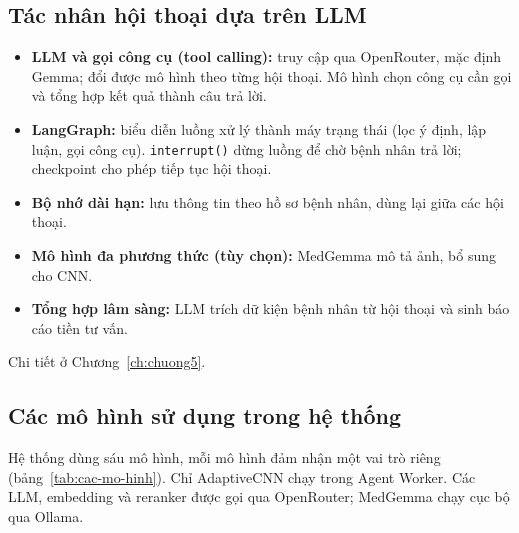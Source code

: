\subsection{Tác nhân hội thoại dựa trên LLM}
\begin{itemize}
  \item \textbf{LLM và gọi công cụ (tool calling):} truy cập qua OpenRouter, mặc định Gemma; đổi được mô hình theo từng hội thoại. Mô hình chọn công cụ cần gọi và tổng hợp kết quả thành câu trả lời.
  \item \textbf{LangGraph:} biểu diễn luồng xử lý thành máy trạng thái (lọc ý định, lập luận, gọi công cụ). \texttt{interrupt()} dừng luồng để chờ bệnh nhân trả lời; checkpoint cho phép tiếp tục hội thoại.
  \item \textbf{Bộ nhớ dài hạn:} lưu thông tin theo hồ sơ bệnh nhân, dùng lại giữa các hội thoại.
  \item \textbf{Mô hình đa phương thức (tùy chọn):} MedGemma mô tả ảnh, bổ sung cho CNN.
  \item \textbf{Tổng hợp lâm sàng:} LLM trích dữ kiện bệnh nhân từ hội thoại và sinh báo cáo tiền tư vấn.
\end{itemize}

Chi tiết ở Chương~\ref{ch:chuong5}.

\subsection{Các mô hình sử dụng trong hệ thống}
\label{sec:cac-mo-hinh}

Hệ thống dùng sáu mô hình, mỗi mô hình đảm nhận một vai trò riêng (bảng~\ref{tab:cac-mo-hinh}). Chỉ AdaptiveCNN chạy trong Agent Worker. Các LLM, embedding và reranker được gọi qua OpenRouter; MedGemma chạy cục bộ qua Ollama.


